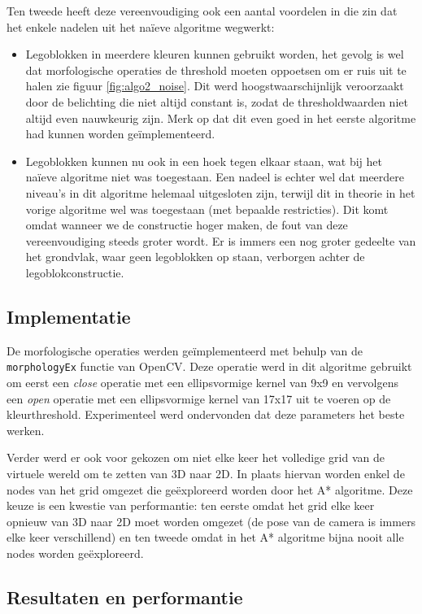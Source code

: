 Ten tweede heeft deze vereenvoudiging ook een aantal voordelen in die zin dat het enkele nadelen uit het na\"ieve algoritme wegwerkt:
\begin{itemize}
\item Legoblokken in meerdere kleuren kunnen gebruikt worden, het gevolg is wel dat morfologische operaties de threshold moeten oppoetsen om er ruis uit te halen zie figuur \ref{fig:algo2_noise}. Dit werd hoogstwaarschijnlijk veroorzaakt door de belichting die niet altijd constant is, zodat de thresholdwaarden niet altijd even nauwkeurig zijn. Merk op dat dit even goed in het eerste algoritme had kunnen worden ge\"implementeerd.
\item Legoblokken kunnen nu ook in een hoek tegen elkaar staan, wat bij het na\"ieve algoritme niet was toegestaan. Een nadeel is echter wel dat meerdere niveau's in dit algoritme helemaal uitgesloten zijn, terwijl dit in theorie in het vorige algoritme wel was toegestaan (met bepaalde restricties). Dit komt omdat wanneer we de constructie hoger maken, de fout van deze vereenvoudiging steeds groter wordt. Er is immers een nog groter gedeelte van het grondvlak, waar geen legoblokken op staan, verborgen achter de legoblokconstructie.
\end{itemize}

\subsection{Implementatie} \label{naive_vereenv_impl}
De morfologische operaties werden ge\"implementeerd met behulp van de \texttt{morphologyEx} functie van OpenCV. Deze operatie werd in dit algoritme gebruikt om eerst een \textit{close} operatie met een ellipsvormige kernel van 9x9 en vervolgens een \textit{open} operatie met een ellipsvormige kernel van 17x17 uit te voeren op de kleurthreshold. Experimenteel werd ondervonden dat deze parameters het beste werken.

Verder werd er ook voor gekozen om niet elke keer het volledige grid van de virtuele wereld om te zetten van 3D naar 2D. In plaats hiervan worden enkel de nodes van het grid omgezet die ge\"exploreerd worden door het A* algoritme. Deze keuze is een kwestie van performantie: ten eerste omdat het grid elke keer opnieuw van 3D naar 2D moet worden omgezet (de pose van de camera is immers elke keer verschillend) en ten tweede omdat in het A* algoritme bijna nooit alle nodes worden ge\"exploreerd.

\subsection{Resultaten en performantie} \label{naive_vereenv_res}

